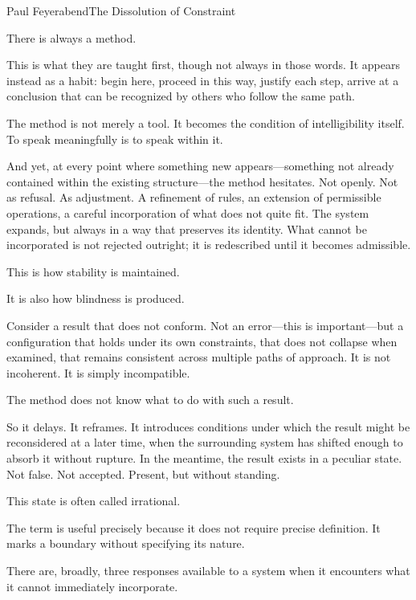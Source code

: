
\begin{formalecho}{Paul Feyerabend}{The Dissolution of Constraint}

There is always a method.

This is what they are taught first, though not always in those
words. It appears instead as a habit: begin here, proceed in this
way, justify each step, arrive at a conclusion that can be
recognized by others who follow the same path.

The method is not merely a tool. It becomes the condition of
intelligibility itself. To speak meaningfully is to speak within
it.

And yet, at every point where something new appears---something not
already contained within the existing structure---the method
hesitates. Not openly. Not as refusal. As adjustment. A refinement
of rules, an extension of permissible operations, a careful
incorporation of what does not quite fit. The system expands, but
always in a way that preserves its identity. What cannot be
incorporated is not rejected outright; it is redescribed until it
becomes admissible.

This is how stability is maintained.

It is also how blindness is produced.

Consider a result that does not conform. Not an error---this is
important---but a configuration that holds under its own
constraints, that does not collapse when examined, that remains
consistent across multiple paths of approach. It is not incoherent.
It is simply incompatible.

The method does not know what to do with such a result.

So it delays. It reframes. It introduces conditions under which
the result might be reconsidered at a later time, when the
surrounding system has shifted enough to absorb it without rupture.
In the meantime, the result exists in a peculiar state. Not false.
Not accepted. Present, but without standing.

This state is often called irrational.

The term is useful precisely because it does not require precise
definition. It marks a boundary without specifying its nature.

\medskip

There are, broadly, three responses available to a system when it
encounters what it cannot immediately incorporate.


\end{formalecho}
